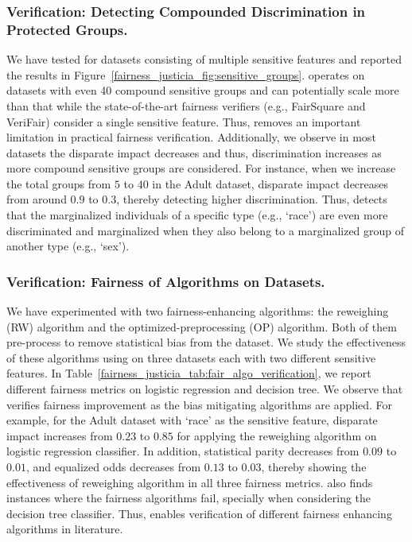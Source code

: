 \subsubsection{Verification: Detecting Compounded Discrimination in Protected Groups.}
We have tested {\justicia} for datasets consisting of multiple sensitive features and reported the results in Figure~\ref{fairness_justicia_fig:sensitive_groups}. {\justicia} operates on datasets with even 40 compound sensitive groups and can potentially scale more than that while the state-of-the-art fairness verifiers (e.g., FairSquare and VeriFair) consider a single sensitive feature.
Thus, {\justicia} removes an important limitation in practical fairness verification. 
Additionally, we observe in most datasets the disparate impact decreases and thus, discrimination increases as more compound sensitive groups are considered. For instance, when we increase the total  groups from $ 5 $ to $ 40 $ in the Adult dataset, disparate impact decreases from around $ 0.9 $ to $ 0.3 $, thereby detecting higher discrimination. Thus, {\justicia} detects that the marginalized individuals of a specific type (e.g., `race')  are even more discriminated and marginalized when they also belong to a marginalized group of another type (e.g., `sex').





\subsubsection{Verification: Fairness of Algorithms on Datasets.}
We have experimented with two fairness-enhancing algorithms: the reweighing (RW) algorithm and the optimized-preprocessing (OP) algorithm.
Both of them pre-process to remove statistical bias from the dataset. 
We study the effectiveness of these algorithms using {\justicia} on three datasets each with two different sensitive features.  
In Table~\ref{fairness_justicia_tab:fair_algo_verification}, we report different fairness metrics on logistic regression and decision tree. We observe that {\justicia} verifies fairness improvement as the bias mitigating algorithms are applied.  For example, for the Adult dataset with `race' as the sensitive feature, disparate impact increases from $ 0.23 $ to $ 0.85 $ for applying the reweighing algorithm on logistic regression classifier. In addition, statistical parity decreases from $ 0.09 $ to $ 0.01 $, and equalized odds decreases from $ 0.13 $ to $ 0.03 $, thereby showing the effectiveness of reweighing algorithm in all three fairness metrics. 
{\justicia} also finds instances where the fairness algorithms fail, specially when considering the decision tree classifier. 
Thus, {\justicia} enables verification of different fairness enhancing algorithms in literature.


